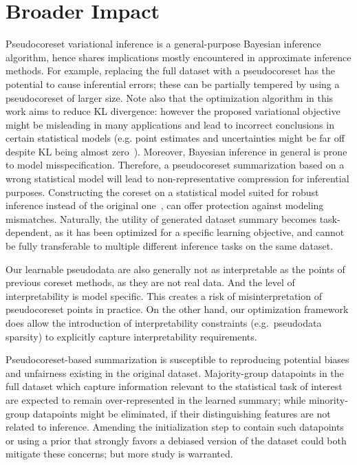 \section*{ Broader Impact}
\label{sec:broader_impact}

Pseudocoreset variational inference is a general-purpose Bayesian inference
algorithm, hence shares implications mostly encountered in approximate
inference methods. For example, replacing the full dataset with a
pseudocoreset has the potential to cause inferential errors; these can be
partially tempered by using a pseudocoreset of larger size. Note also
that the optimization algorithm in this work aims to reduce 
KL divergence: however the proposed
variational objective might be misleading in many applications and lead to
incorrect conclusions in certain statistical models (e.g. point estimates and
uncertainties might be far off despite KL being almost zero~\citep{huggins20}).
 Moreover, Bayesian inference in general is prone to model misspecification.
Therefore, a pseudocoreset summarization based on a wrong statistical model
will lead to non-representative compression for inferential purposes.
Constructing the coreset on a statistical model suited for robust inference
instead of the original one~\citep{miller19, wang17}, can offer protection
against modeling mismatches. Naturally, the utility of generated dataset
summary becomes task-dependent, as it has been optimized for a specific
learning objective, and cannot be fully transferable to multiple different
inference tasks on the same dataset.

Our learnable pseudodata are also generally not as interpretable 
as the points of previous coreset methods, as they are not real data. And the level of 
interpretability is model specific. This creates a risk of misinterpretation
of pseudocoreset points in practice. On the other hand, our optimization framework
does allow the introduction of interpretability constraints (e.g.~pseudodata sparsity)
to explicitly capture interpretability requirements.

Pseudocoreset-based summarization is susceptible to reproducing potential
biases and unfairness existing in the original dataset. Majority-group datapoints in the full dataset which capture information relevant to the
statistical task of interest are expected to remain over-represented in the
learned summary; while minority-group datapoints might be eliminated, if their
distinguishing features are not related to inference. Amending the
initialization step to contain such datapoints or using a prior that
strongly favors a debiased version of the dataset could both mitigate these
concerns; but more study is warranted.
